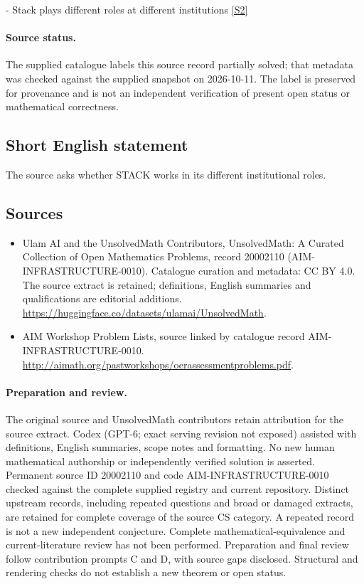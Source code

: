 \documentclass[11pt]{article}
\newcommand{\sref}[2]{\hyperlink{source:#1:#2}{[S#2]}}
\begin{document}
- Stack plays different roles at different institutions \sref{20002110}{2}
\paragraph{Source status.}
The supplied catalogue labels this source record partially solved; that metadata was checked against the supplied snapshot on 2026-10-11. The label is preserved for provenance and is not an independent verification of present open status or mathematical correctness.
\subsection{Short English statement}
The source asks whether STACK works in its different institutional roles.
\subsection{Sources}
\begin{itemize}
\item[\hypertarget{source:20002110:1}{S1}] Ulam AI and the UnsolvedMath Contributors, UnsolvedMath: A Curated Collection of Open Mathematics Problems, record 20002110 (AIM-INFRASTRUCTURE-0010). Catalogue curation and metadata: CC BY 4.0. The source extract is retained; definitions, English summaries and qualifications are editorial additions.
\url{https://huggingface.co/datasets/ulamai/UnsolvedMath}.
\item[\hypertarget{source:20002110:2}{S2}] AIM Workshop Problem Lists, source linked by catalogue record AIM-INFRASTRUCTURE-0010.
\url{http://aimath.org/pastworkshops/oerassessmentproblems.pdf}.
\end{itemize}
\paragraph{Preparation and review.}
The original source and UnsolvedMath contributors retain attribution for the source extract. Codex (GPT-6; exact serving revision not exposed) assisted with definitions, English summaries, scope notes and formatting. No new human mathematical authorship or independently verified solution is asserted. Permanent source ID 20002110 and code AIM-INFRASTRUCTURE-0010 checked against the complete supplied registry and current repository. Distinct upstream records, including repeated questions and broad or damaged extracts, are retained for complete coverage of the source CS category. A repeated record is not a new independent conjecture. Complete mathematical-equivalence and current-literature review has not been performed. Preparation and final review follow contribution prompts C and D, with source gaps disclosed. Structural and rendering checks do not establish a new theorem or open status.
\label{end:20002110}
\end{document}
